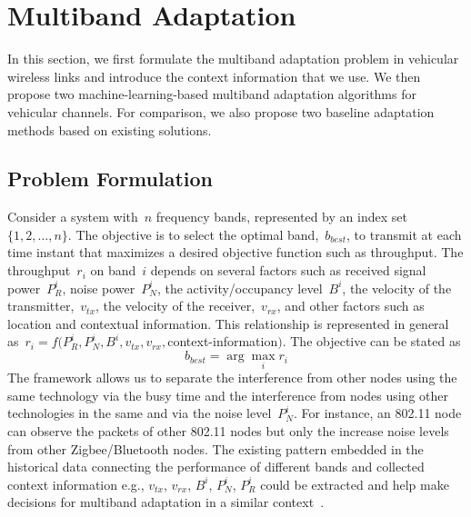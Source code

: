 \section{Multiband Adaptation}
\label{sec:model}
In this section, we first formulate the multiband 
adaptation problem in vehicular wireless links and introduce the context information 
that we use. We then propose two machine-learning-based 
multiband adaptation algorithms for vehicular channels. For comparison, we also propose two baseline adaptation methods based on existing solutions.

\subsection{Problem Formulation}
Consider a system with~$n$ frequency bands, represented by an index set~$\{1,2, \ldots, n\}$. 
The objective is to select the optimal band,~$b_{best}$, to transmit at each time instant that maximizes a desired objective function such as throughput. The throughput~$r_i$ on band~$i$ depends on several factors such as received signal power~$P_R^i$, noise power~$P_N^i$, the activity/occupancy level~$B^i$, the velocity of the transmitter,~$v_{tx}$, the velocity of the receiver,~$v_{rx}$, and other factors such as location and contextual information. This relationship is represented in general as~$r_i = f(P_R^i,P_N^i,B^i,v_{tx},v_{rx},$context-information$)$. The objective can be stated as
\begin{equation}
b_{best}= \arg \max_i r_i 
\end{equation}
The framework allows us to separate the interference from other nodes using the same technology via the busy time and the interference from nodes using other technologies in the same and via the noise level~$P_N^i$. For instance, an 802.11 node can observe the packets of other 802.11 nodes but only the increase noise levels from other Zigbee/Bluetooth nodes.
The existing pattern embedded in the historical data connecting 
the performance of different bands and collected context information 
e.g., $v_{tx}$, $v_{rx}$, $B^i$, $P_N^i$, $P_R^i$ 
could be extracted and help make decisions
for multiband adaptation in a similar context~\cite{meikle2012global}.


